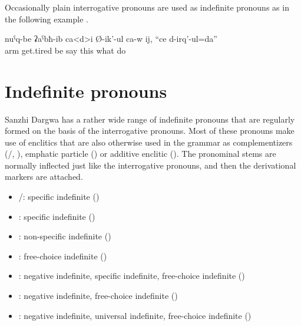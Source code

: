 Occasionally plain interrogative pronouns are used as indefinite pronouns as in the following example .
%
\begin{exe}
	\ex	\label{ex:He says, my hands got tired, I do something}
	\gll	nuˁq-be	ʡaˁbħ-ib ca<d>i	Ø-ik'-ul ca-w	ij,	``ce	d-irq'-ul=da''\\
		arm	get.tired be	say 	this	what	do\\
	\glt	{}
\end{exe}



\section{Indefinite pronouns}
\label{sec:Indefinite pronouns}

Sanzhi Dargwa has a rather wide range of indefinite pronouns that are regularly formed on the basis of the interrogative pronouns. Most of these pronouns make use of enclitics that are also otherwise used in the grammar as complementizers (\slash{}, ), emphatic particle () or additive enclitic (). The pronominal stems are normally inflected just like the interrogative pronouns, and then the derivational markers are attached.
%
\begin{itemize}
	\item	{}\slash{}: specific indefinite ()
		\item	{}: specific indefinite ()
	\item	{}: non-specific indefinite ()
	\item	{}: free-choice indefinite ()
	\item	{}: negative indefinite, specific indefinite, free-choice indefinite ()
		\item	{}: negative indefinite, free-choice indefinite ()
	\item	{}: negative indefinite, universal indefinite, free-choice indefinite ()
\end{itemize}

